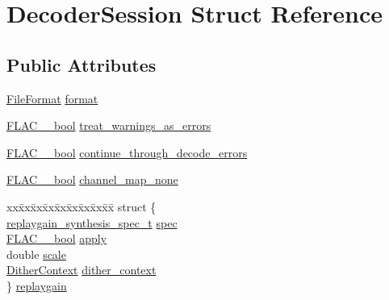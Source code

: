 \hypertarget{struct_decoder_session}{}\section{Decoder\+Session Struct Reference}
\label{struct_decoder_session}
\subsection*{Public Attributes}
\begin{DoxyCompactItemize}
\item 
\hyperlink{libflac_2src_2flac_2utils_8h_a610845e6f56e545283af144cbbb99cfe}{File\+Format} \hyperlink{struct_decoder_session_a518467adf881fa0723062c7830e33310}{format}
\item 
\hyperlink{ordinals_8h_a95103469f1cbd78b8cf250194985b34e}{F\+L\+A\+C\+\_\+\+\_\+bool} \hyperlink{struct_decoder_session_a4ae410f3f0de6ed34b21e9cb517d62f5}{treat\+\_\+warnings\+\_\+as\+\_\+errors}
\item 
\hyperlink{ordinals_8h_a95103469f1cbd78b8cf250194985b34e}{F\+L\+A\+C\+\_\+\+\_\+bool} \hyperlink{struct_decoder_session_a06e87dfaddbc0119c3f88748b70b1621}{continue\+\_\+through\+\_\+decode\+\_\+errors}
\item 
\hyperlink{ordinals_8h_a95103469f1cbd78b8cf250194985b34e}{F\+L\+A\+C\+\_\+\+\_\+bool} \hyperlink{struct_decoder_session_a9e72001dce47430891b7d0e4a3a298b9}{channel\+\_\+map\+\_\+none}
\item 
\begin{tabbing}
xx\=xx\=xx\=xx\=xx\=xx\=xx\=xx\=xx\=\kill
struct \{\\
\>\hyperlink{structreplaygain__synthesis__spec__t}{replaygain\_synthesis\_spec\_t} \hyperlink{struct_decoder_session_a0babfed5783706c8cd54ce3cc9e6b491}{spec}\\
\>\hyperlink{ordinals_8h_a95103469f1cbd78b8cf250194985b34e}{FLAC\_\_bool} \hyperlink{struct_decoder_session_adfd9e5e1b9369320c3b5cddcb8e8d65a}{apply}\\
\>double \hyperlink{struct_decoder_session_a71c4b87d28f34f9e3d52a7629643e99e}{scale}\\
\>\hyperlink{struct_dither_context}{DitherContext} \hyperlink{struct_decoder_session_a75b22de880c5344c896ed4c464f25c60}{dither\_context}\\
\} \hyperlink{struct_decoder_session_ae7d49472e7468e617b1e2c35c5f61d7b}{replaygain}\\


\end{tabbing}
\end{DoxyCompactItemize}
